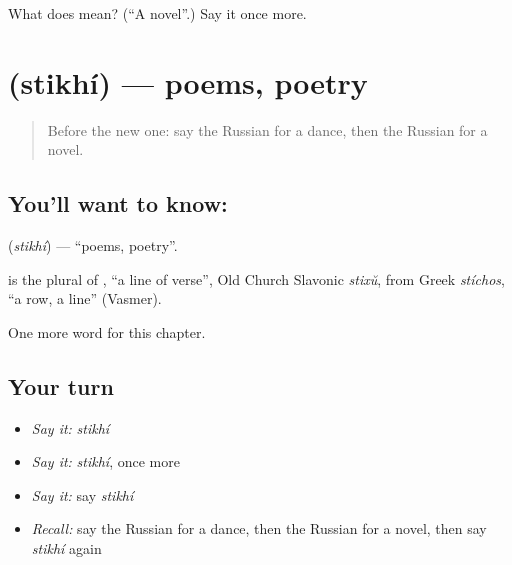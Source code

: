 \begin{tcolorbox}[breakable,colback=teal!4,colframe=teal!35!black,title={Before you move on}]
What does  mean? (\textquotedblleft{}A novel\textquotedblright{}.) Say it once more.
\end{tcolorbox}
\section[\texorpdfstring{\ru{стихи} (stikhí)}{стихи (stikhí)}]{ (stikhí) — poems, poetry}

\label{lesson:RU-C226-stikhi}



\begin{quote}
Before the new one: say the Russian for a dance, then the Russian for a novel.
\end{quote}

\subsection*{You'll want to know: }
\textbf{} (\emph{stikhí}) — \textquotedblleft{}poems, poetry\textquotedblright{}.

\begin{cousinweb}
\textbf{} is the plural of \emph{}, \textquotedblleft{}a line of verse\textquotedblright{}, Old Church Slavonic \emph{stixŭ}, from Greek \emph{stíchos}, \textquotedblleft{}a row, a line\textquotedblright{} (Vasmer).
\end{cousinweb}

\begin{grammarlens}[title={What you've built}]
One more word for this chapter.
\end{grammarlens}

\subsection*{Your turn}
\begin{itemize}
\raggedright
  \item \emph{Say it:} \emph{stikhí}
  \item \emph{Say it:} \emph{stikhí}, once more
  \item \emph{Say it:} say \emph{stikhí}
  \item \emph{Recall:} say the Russian for a dance, then the Russian for a novel, then say \emph{stikhí} again
\end{itemize}

